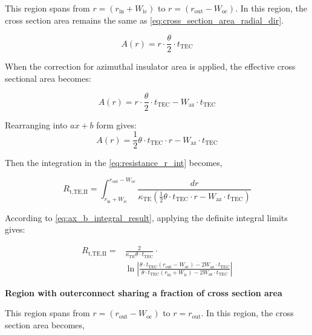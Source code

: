 \documentclass[10pt,a4paper,twocolumn]{article}
\begin{document}
This region spans from $r=(r_{\text{in}}+W_{\text{ic}})$ to $r=(r_{\text{out}}-W_{\text{oc}})$. In this region, the cross section area remains the same as \cref{eq:cross_section_area_radial_dir}.

\begin{equation*}
  A(r) = r \cdot \frac{\theta}{2} \cdot t_{\text{TEC}}
\end{equation*}

When the correction for azimuthal insulator area is applied, the effective cross sectional area becomes:

\begin{equation*}
  A(r) = r \cdot \frac{\theta}{2}  \cdot t_{\text{TEC}} - W_{\text{az}} \cdot t_{\text{TEC}}
\end{equation*}

Rearranging into $ax+b$ form gives:
\begin{equation}
  A(r) = \frac{1}{2}\theta \cdot t_{\text{TEC}} \cdot r - W_{\text{az}} \cdot t_{\text{TEC}}
  \label{eq:area_TE_full}
\end{equation}

Then the integration in the \cref{eq:resistance_r_int} becomes,

\begin{equation*}
  R_{\text{t,TE,II}} = \int_{r_{\text{in}}+W_{\text{ic}}}^{r_{\text{out}}-W_{\text{oc}}} \frac{dr}{\kappa_{\text{TE}} \left( \frac{1}{2}\theta \cdot t_{\text{TEC}} \cdot r - W_{\text{az}} \cdot t_{\text{TEC}} \right)}
\end{equation*}

According to \cref{eq:ax_b_integral_result}, applying the definite integral limits gives:

\begin{equation}
  \begin{aligned}
    R_{\text{t,TE,II}} = & \frac{2}{\kappa_{\text{TE}} \theta \cdot t_{\text{TEC}}} \cdot \\ & \ln \left| \frac{\theta \cdot t_{\text{TEC}} (r_{\text{out}}-W_{\text{oc}}) - 2 W_{\text{az}} \cdot t_{\text{TEC}}}{\theta \cdot t_{\text{TEC}} (r_{\text{in}}+W_{\text{ic}}) - 2 W_{\text{az}} \cdot t_{\text{TEC}}} \right|
    \label{eq:TE_II_t_res}
  \end{aligned}
\end{equation}

\textbf{Region with outerconnect sharing  a fraction of cross section area}

This region spans from $r=(r_{\text{out}}-W_{\text{oc}})$ to $r=r_{\text{out}}$. In this region, the cross section area becomes,
\end{document}
